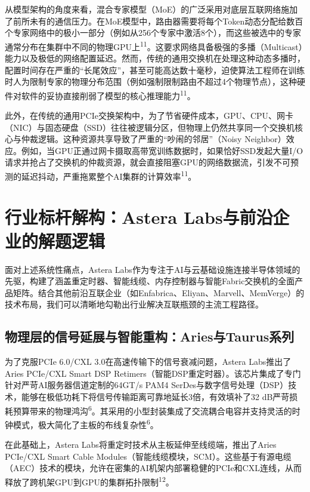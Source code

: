 从模型架构的角度来看，混合专家模型（MoE）的广泛采用对底层互联网络施加了前所未有的通信压力。在MoE模型中，路由器需要将每个Token动态分配给数百个专家网络中的极小一部分（例如从256个专家中激活8个），而这些被选中的专家通常分布在集群中不同的物理GPU上\textsuperscript{11}。这要求网络具备极强的多播（Multicast）能力以及极低的网络配置延迟。然而，传统的通用交换机在处理这种动态多播时，配置时间存在严重的``长尾效应''，甚至可能高达数十毫秒，迫使算法工程师在训练时人为限制专家的物理分布范围（例如强制限制路由不超过4个物理节点），这种硬件对软件的妥协直接削弱了模型的核心推理能力\textsuperscript{11}。

此外，在传统的通用PCIe交换架构中，为了节省硬件成本，GPU、CPU、网卡（NIC）与固态硬盘（SSD）往往被逻辑分区，但物理上仍然共享同一个交换机核心与仲裁逻辑。这种资源共享导致了严重的``吵闹的邻居''（Noisy Neighbor）效应。例如，当GPU正通过网卡摄取高带宽训练数据时，如果恰好SSD发起大量I/O请求并抢占了交换机的仲裁资源，就会直接阻塞GPU的网络数据流，引发不可预测的延迟抖动，严重拖累整个AI集群的计算效率\textsuperscript{11}。

\section{行业标杆解构：Astera Labs与前沿企业的解题逻辑}

面对上述系统性痛点，Astera Labs作为专注于AI与云基础设施连接半导体领域的先驱，构建了涵盖重定时器、智能线缆、内存控制器与智能Fabric交换机的全面产品矩阵。结合其他前沿互联企业（如Enfabrica、Eliyan、Marvell、MemVerge）的技术布局，我们可以清晰地勾勒出行业解决互联瓶颈的主流工程路径。

\subsection{物理层的信号延展与智能重构：Aries与Taurus系列}

为了克服PCIe 6.0/CXL 3.0在高速传输下的信号衰减问题，Astera Labs推出了Aries PCIe/CXL Smart DSP Retimers（智能DSP重定时器）。该芯片集成了专门针对严苛AI服务器信道定制的64GT/s PAM4 SerDes与数字信号处理（DSP）技术，能够在极低功耗下将信号传输距离可靠地延长3倍，有效填补了32 dB严苛损耗预算带来的物理鸿沟\textsuperscript{6}。其采用的小型封装集成了交流耦合电容并支持灵活的时钟模式，极大简化了主板的布线复杂性\textsuperscript{6}。

在此基础上，Astera Labs将重定时技术从主板延伸至线缆端，推出了Aries PCIe/CXL Smart Cable Modules（智能线缆模块，SCM）。这些基于有源电缆（AEC）技术的模块，允许在密集的AI机架内部署稳健的PCIe和CXL连线，从而释放了跨机架GPU到GPU的集群拓扑限制\textsuperscript{12}。


